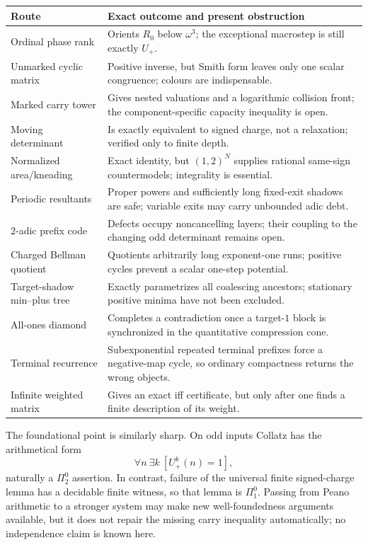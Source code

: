 \documentclass[11pt,reqno]{amsart}
\theoremstyle{remark}
\newcommand{\Up}{U_{+}}
\begin{document}
\begin{center}
\small
\begin{tabular}{p{}p{}}
\toprule
Route & Exact outcome and present obstruction\\
\midrule
Ordinal phase rank & Orients $R_0$ below $\omega^3$; the exceptional macrostep
is still exactly $\Up$.\\
Unmarked cyclic matrix & Positive inverse, but Smith form leaves only one
scalar congruence; colours are indispensable.\\
Marked carry tower & Gives nested valuations and a logarithmic collision
front; the component-specific capacity inequality is open.\\
Moving determinant & Is exactly equivalent to signed charge, not a
relaxation; verified only to finite depth.\\
Normalized area/kneading & Exact identity, but $(1,2)^N$ supplies rational
same-sign countermodels; integrality is essential.\\
Periodic resultants & Proper powers and sufficiently long fixed-exit shadows
are safe; variable exits may carry unbounded adic debt.\\
$2$-adic prefix code & Defects occupy noncancelling layers; their coupling to
the changing odd determinant remains open.\\
Charged Bellman quotient & Quotients arbitrarily long exponent-one runs;
positive cycles prevent a scalar one-step potential.\\
Target-shadow min--plus tree & Exactly parametrizes all coalescing ancestors;
stationary positive minima have not been excluded.\\
All-ones diamond & Completes a contradiction once a target-$1$ block is
synchronized in the quantitative compression cone.\\
Terminal recurrence & Subexponential repeated terminal prefixes force a
negative-map cycle, so ordinary compactness returns the wrong objects.\\
Infinite weighted matrix & Gives an exact iff certificate, but only after one
finds a finite description of its weight.\\
\bottomrule
\end{tabular}
\end{center}

The foundational point is similarly sharp.  On odd inputs Collatz has the
arithmetical form
\[
 \forall n\ \exists k\ [\Up^k(n)=1],
\]
naturally a $\Pi^0_2$ assertion.  In contrast, failure of the universal
finite signed-charge lemma has a decidable finite witness, so that lemma is
$\Pi^0_1$.  Passing from Peano arithmetic to a stronger system may make new
well-foundedness arguments available, but it does not repair the missing
carry inequality automatically; no independence claim is known here.
\end{document}
